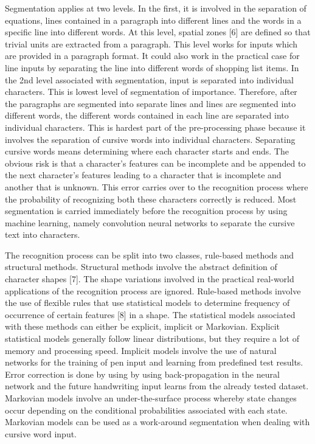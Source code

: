 Segmentation applies at two levels. In the first, it is involved in the separation of equations, lines contained in a paragraph into different lines and the words in a specific line into different words. At this level, spatial zones [6] are defined so that trivial units are extracted from a paragraph. This level works for inputs which are provided in a paragraph format. It could also work in the practical case for line inputs by separating the line into different words of shopping list items. In the 2nd level associated with segmentation, input is separated into individual characters. This is lowest level of segmentation of importance. Therefore, after the paragraphs are segmented into separate lines and lines are segmented into different words, the different words contained in each line are separated into individual characters. This is hardest part of the pre-processing phase because it involves the separation of cursive words into individual characters. Separating cursive words means determining where each character starts and ends. The obvious risk is that a character’s features can be incomplete and be appended to the next character’s features leading to a character that is incomplete and another that is unknown. This error carries over to the recognition process where the probability of recognizing both these characters correctly is reduced. Most segmentation is carried immediately before the recognition process by using machine learning, namely convolution neural networks to separate the cursive text into characters.

The recognition process can be split into two classes, rule-based methods and structural methods. Structural methods involve the abstract definition of character shapes [7]. The shape variations involved in the practical real-world applications of the recognition process are ignored. Rule-based methods involve the use of flexible rules that use statistical models to determine frequency of occurrence of certain features [8] in a shape. The statistical models associated with these methods can either be explicit, implicit or Markovian. Explicit statistical models generally follow linear distributions, but they require a lot of memory and processing speed. Implicit models involve the use of natural networks for the training of pen input and learning from predefined test results. Error correction is done by using by using back-propagation in the neural network and the future handwriting input learns from the already tested dataset. Markovian models involve an under-the-surface process whereby state changes occur depending on the conditional probabilities associated with each state. Markovian models can be used as a work-around segmentation when dealing with cursive word input.

